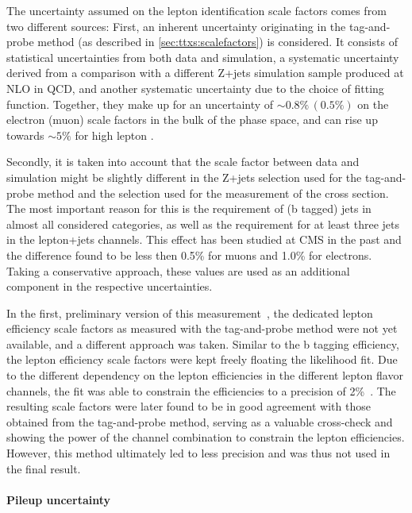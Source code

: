 The uncertainty assumed on the lepton identification scale factors comes from two different sources: First, an inherent uncertainty originating in the tag-and-probe method (as described in \cref{sec:ttxs:scalefactors}) is considered. It consists of statistical uncertainties from both data and simulation, a systematic uncertainty derived from a comparison with a different Z+jets simulation sample produced at NLO in QCD, and another systematic uncertainty due to the choice of fitting function. Together, they make up for an uncertainty of $\sim 0.8\% \, (0.5\%)$ on the electron (muon) scale factors in the bulk of the phase space, and can rise up towards $\sim 5\%$ for high lepton \pt.

Secondly, it is taken into account that the scale factor between data and simulation might be slightly different in the Z+jets selection used for the tag-and-probe method and the \ttbar selection used for the measurement of the cross section. The most important reason for this is the requirement of (b tagged) jets in almost all considered categories, as well as the requirement for at least three jets in the lepton+jets channels. 
This effect has been studied at CMS in the past and the difference found to be less then 0.5\% for muons and 1.0\% for electrons. Taking a conservative approach, these values are used as an additional component in the respective uncertainties.

In the first, preliminary version of this measurement~\cite{CMS:TOP-22-012-PAS}, the dedicated lepton efficiency scale factors as measured with the tag-and-probe method were not yet available, and a different approach was taken. Similar to the b tagging efficiency, the lepton efficiency scale factors were kept freely floating the likelihood fit. Due to the different dependency on the lepton efficiencies in the different lepton flavor channels, the fit was able to constrain the efficiencies to a precision of 2\%~\cite{CMS:TOP-22-012}. The resulting scale factors were later found to be in good agreement with those obtained from the tag-and-probe method, serving as a valuable cross-check and showing the power of the channel combination to constrain the lepton efficiencies. However, this method ultimately led to less precision and was thus not used in the final result.

\paragraph{Pileup uncertainty}

